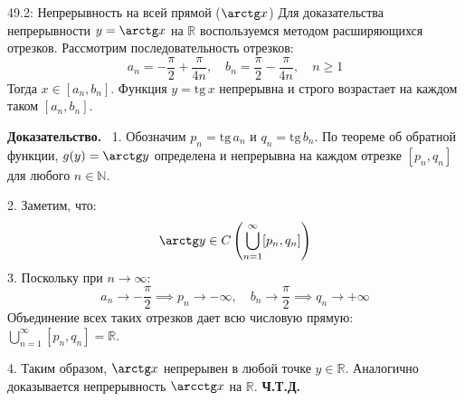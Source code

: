 \documentclass[a4paper,12pt]{article}
\newcommand{\myproof}{\textbf{Доказательство.}\ }
\begin{document}
	
	\begin{center}
	\end{center}
	
	\begin{theorembox}{49.2: Непрерывность на всей прямой ($\arctg x$)}
		Для доказательства непрерывности $y = \arctg x$ на $\mathbb{R}$ воспользуемся методом расширяющихся отрезков. Рассмотрим последовательность отрезков:
		$$ a_n = -\frac{\pi}{2} + \frac{\pi}{4n}, \quad b_n = \frac{\pi}{2} - \frac{\pi}{4n}, \quad n \geq 1 $$
		Тогда $x \in [a_n, b_n]$. Функция $y = \text{tg}\,x$ непрерывна и строго возрастает на каждом таком $[a_n, b_n]$.
	\end{theorembox}
	
	\vspace{0.5cm}
	\myproof
	1. Обозначим $p_n = \text{tg}\,a_n$ и $q_n = \text{tg}\,b_n$. По теореме об обратной функции, $g(y) = \arctg y$ определена и непрерывна на каждом отрезке $[p_n, q_n]$ для любого $n \in \mathbb{N}$.
	
	2. Заметим, что:
	$$ \arctg y \in C\left( \bigcup_{n=1}^{\infty} [p_n, q_n] \right) $$
	3. Поскольку при $n \to \infty$:
	$$ a_n \to -\frac{\pi}{2} \implies p_n \to -\infty, \quad b_n \to \frac{\pi}{2} \implies q_n \to +\infty $$
	Объединение всех таких отрезков дает всю числовую прямую: $\bigcup_{n=1}^{\infty} [p_n, q_n] = \mathbb{R}$.
	
	4. Таким образом, $\arctg x$ непрерывен в любой точке $y \in \mathbb{R}$. Аналогично доказывается непрерывность $\arcctg x$ на $\mathbb{R}$.
	\textbf{Ч.Т.Д.}
	
\end{document}
